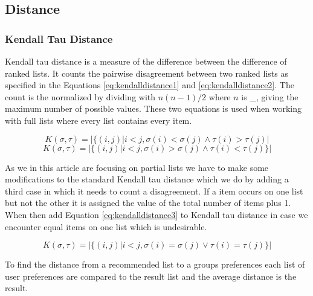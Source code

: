 \subsection{Distance}

\subsubsection{Kendall Tau Distance}
Kendall tau distance is a measure of the difference between the difference of ranked lists\citep{rank:aggregation}. It counts the pairwise disagreement between two ranked lists as specified in the Equations \ref{eq:kendalldistance1} and \ref{eq:kendalldistance2}. The count is the normalized by dividing with $n(n-1)/2$ where $n$ is \_, giving the maximum number of possible values. 
These two equations is used when working with full lists where every list contains every item. 

\begin{equation}\label{eq:kendalldistance1}
K(\sigma,\tau) = | \{(i,j) | i < j, \sigma (i) < \sigma (j) \land \tau (i) > \tau (j)|
\end{equation}
\begin{equation}\label{eq:kendalldistance2}
K(\sigma,\tau) = | \{(i,j) | i < j, \sigma (i) > \sigma (j) \land \tau (i) < \tau (j) \} |
\end{equation}

As we in this article are focusing on partial lists we have to make some modifications to the standard Kendall tau distance which we do by adding a third case in which it needs to count a disagreement. If a item occurs on one list but not the other it is assigned the value of the total number of items plus 1. When then add Equation \ref{eq:kendalldistance3} to Kendall tau distance in case we encounter equal items on one list which is undesirable. 

\begin{equation}\label{eq:kendalldistance3}
K(\sigma,\tau) = | \{(i,j) | i < j, \sigma (i) = \sigma (j) \lor \tau (i) = \tau (j) \} |
\end{equation}

To find the distance from a recommended list to a groups preferences each list of user preferences are compared to the result list and the average distance is the result. 



